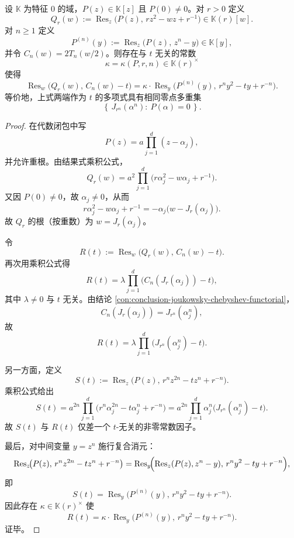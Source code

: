 \begin{conclusion}\label{con:conclusion-lee-yang-chebyshev-resultant}
设 \(\mathbb{K}\) 为特征 \(0\) 的域，\(P(z)\in\mathbb{K}[z]\) 且 \(P(0)\neq 0\)。对 \(r>0\) 定义
\[
Q_r(w):=\operatorname{Res}_z\!\bigl(P(z),\,r z^2-wz+r^{-1}\bigr)\in\mathbb{K}(r)[w].
\]
对 \(n\ge 1\) 定义
\[
P^{(n)}(y):=\operatorname{Res}_z\!\bigl(P(z),\,z^n-y\bigr)\in\mathbb{K}[y],
\]
并令 \(C_n(w)=2T_n(w/2)\)。则存在与 \(t\) 无关的常数
\[
\kappa=\kappa(P,r,n)\in\mathbb{K}(r)^\times
\]
使得
\[
\operatorname{Res}_w\!\bigl(Q_r(w),\,C_n(w)-t\bigr)
=\kappa\cdot \operatorname{Res}_y\!\bigl(P^{(n)}(y),\,r^n y^2-ty+r^{-n}\bigr).
\]
等价地，上式两端作为 \(t\) 的多项式具有相同零点多重集
\[
\left\{\,J_{r^n}(\alpha^n):\ P(\alpha)=0\,\right\}.
\]
\end{conclusion}
\begin{proof}
在代数闭包中写
\[
P(z)=a\prod_{j=1}^{d}(z-\alpha_j),
\]
并允许重根。由结果式乘积公式，
\[
Q_r(w)=a^2\prod_{j=1}^{d}\bigl(r\alpha_j^2-w\alpha_j+r^{-1}\bigr).
\]
又因 \(P(0)\neq 0\)，故 \(\alpha_j\neq 0\)，从而
\[
r\alpha_j^2-w\alpha_j+r^{-1}=-\alpha_j\bigl(w-J_r(\alpha_j)\bigr).
\]
故 \(Q_r\) 的根（按重数）为 \(w=J_r(\alpha_j)\)。

令
\[
R(t):=\operatorname{Res}_w\!\bigl(Q_r(w),\,C_n(w)-t\bigr).
\]
再次用乘积公式得
\[
R(t)=\lambda\prod_{j=1}^{d}\bigl(C_n(J_r(\alpha_j))-t\bigr),
\]
其中 \(\lambda\neq 0\) 与 \(t\) 无关。由结论 \ref{con:conclusion-joukowsky-chebyshev-functorial}，
\[
C_n(J_r(\alpha_j))=J_{r^n}(\alpha_j^n),
\]
故
\[
R(t)=\lambda\prod_{j=1}^{d}\bigl(J_{r^n}(\alpha_j^n)-t\bigr).
\]

另一方面，定义
\[
S(t):=\operatorname{Res}_z\!\bigl(P(z),\,r^n z^{2n}-tz^n+r^{-n}\bigr).
\]
乘积公式给出
\[
S(t)=a^{2n}\prod_{j=1}^{d}\bigl(r^n\alpha_j^{2n}-t\alpha_j^n+r^{-n}\bigr)
=a^{2n}\prod_{j=1}^{d}\alpha_j^n\bigl(J_{r^n}(\alpha_j^n)-t\bigr).
\]
故 \(S(t)\) 与 \(R(t)\) 仅差一个 \(t\)-无关的非零常数因子。

最后，对中间变量 \(y=z^n\) 施行复合消元：
\[
\operatorname{Res}_z\!\bigl(P(z),\,r^n z^{2n}-tz^n+r^{-n}\bigr)
=\operatorname{Res}_y\!\Bigl(\operatorname{Res}_z(P(z),z^n-y),\,r^n y^2-ty+r^{-n}\Bigr),
\]
即
\[
S(t)=\operatorname{Res}_y\!\bigl(P^{(n)}(y),\,r^n y^2-ty+r^{-n}\bigr).
\]
因此存在 \(\kappa\in\mathbb{K}(r)^\times\) 使
\[
R(t)=\kappa\cdot \operatorname{Res}_y\!\bigl(P^{(n)}(y),\,r^n y^2-ty+r^{-n}\bigr).
\]
证毕。
\end{proof}

